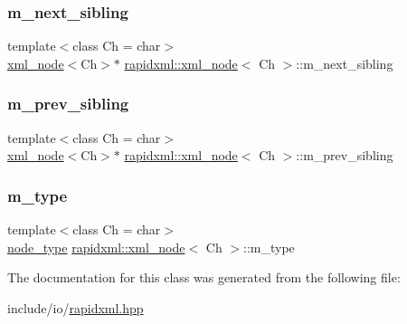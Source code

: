 \mbox{\label{classrapidxml_1_1xml__node_a202e84dfdd34cb65557b64e31b7e205a}} 
\subsubsection{\texorpdfstring{m\_next\_sibling}{m\_next\_sibling}}
{\footnotesize\ttfamily template$<$class Ch = char$>$ \\
\mbox{\hyperlink{classrapidxml_1_1xml__node}{xml\+\_\+node}}$<$Ch$>$$\ast$ \mbox{\hyperlink{classrapidxml_1_1xml__node}{rapidxml\+::xml\+\_\+node}}$<$ Ch $>$\+::m\+\_\+next\+\_\+sibling\hspace{0.3cm}{\ttfamily [private]}}

\mbox{\label{classrapidxml_1_1xml__node_a571f24c86107f8442f46a514a7cc5d0d}} 
\subsubsection{\texorpdfstring{m\_prev\_sibling}{m\_prev\_sibling}}
{\footnotesize\ttfamily template$<$class Ch = char$>$ \\
\mbox{\hyperlink{classrapidxml_1_1xml__node}{xml\+\_\+node}}$<$Ch$>$$\ast$ \mbox{\hyperlink{classrapidxml_1_1xml__node}{rapidxml\+::xml\+\_\+node}}$<$ Ch $>$\+::m\+\_\+prev\+\_\+sibling\hspace{0.3cm}{\ttfamily [private]}}

\mbox{\label{classrapidxml_1_1xml__node_a33912a5ceef221d662bbac67c70e1397}} 
\subsubsection{\texorpdfstring{m\_type}{m\_type}}
{\footnotesize\ttfamily template$<$class Ch = char$>$ \\
\mbox{\hyperlink{namespacerapidxml_abb456db38f7efb746c4330eed6072a7c}{node\+\_\+type}} \mbox{\hyperlink{classrapidxml_1_1xml__node}{rapidxml\+::xml\+\_\+node}}$<$ Ch $>$\+::m\+\_\+type\hspace{0.3cm}{\ttfamily [private]}}



The documentation for this class was generated from the following file\+:\begin{DoxyCompactItemize}
\item 
include/io/\mbox{\hyperlink{rapidxml_8hpp}{rapidxml.\+hpp}}\end{DoxyCompactItemize}
